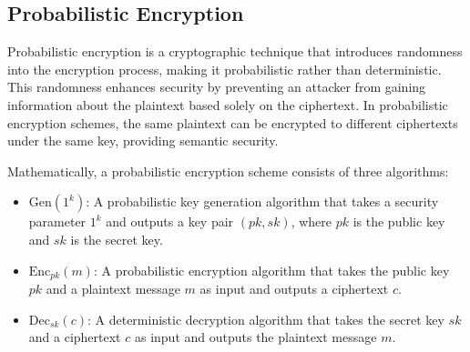 \documentclass[12pt]{book} %
\begin{document}
\subsection{Probabilistic Encryption}

Probabilistic encryption is a cryptographic technique that introduces randomness into the encryption process, making it probabilistic rather than deterministic. This randomness enhances security by preventing an attacker from gaining information about the plaintext based solely on the ciphertext. In probabilistic encryption schemes, the same plaintext can be encrypted to different ciphertexts under the same key, providing semantic security.

Mathematically, a probabilistic encryption scheme consists of three algorithms:
\begin{itemize}
    \item $\text{Gen}(1^k)$: A probabilistic key generation algorithm that takes a security parameter $1^k$ and outputs a key pair $(pk, sk)$, where $pk$ is the public key and $sk$ is the secret key.
    \item $\text{Enc}_{pk}(m)$: A probabilistic encryption algorithm that takes the public key $pk$ and a plaintext message $m$ as input and outputs a ciphertext $c$.
    \item $\text{Dec}_{sk}(c)$: A deterministic decryption algorithm that takes the secret key $sk$ and a ciphertext $c$ as input and outputs the plaintext message $m$.
\end{itemize}
\end{document}

